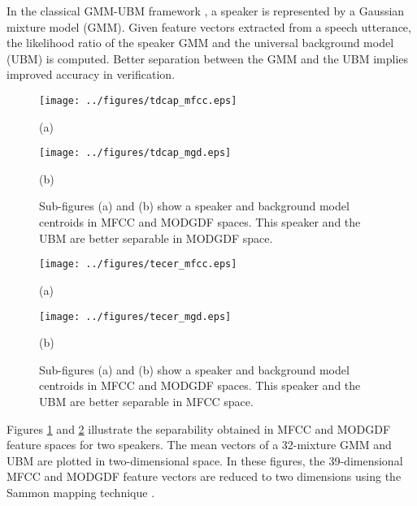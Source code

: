 \documentclass[preprint,12pt,5p]{elsarticle}
\begin{document}
In the classical GMM-UBM framework \cite{reynoldsAdaptedGMM}, a speaker is
represented by a Gaussian mixture model (GMM). Given feature vectors extracted
from a speech utterance, the likelihood ratio of the speaker GMM and the
universal background model (UBM) is computed. Better separation between the GMM
and the UBM implies improved accuracy in verification.

\begin{figure}[h]
\centering 
\begin{minipage}[c]{0.5\textwidth}
\centering 
    \texttt{[image: ../figures/tdcap\_mfcc.eps]}
	\caption*{(a)}
\end{minipage}

\begin{minipage}[c]{0.5\textwidth}
\centering  
\vspace{3mm}
    \texttt{[image: ../figures/tdcap\_mgd.eps]}

	\caption*{(b)}
\end{minipage}
\caption{Sub-figures (a) and (b) show a speaker and background model
centroids in MFCC and MODGDF spaces. This speaker and the UBM are better
separable in MODGDF space.}
\label{fig:ubm_sep1}
\end{figure}

\begin{figure}[h]
\centering 
\begin{minipage}[c]{0.5\textwidth}
\centering 
    \texttt{[image: ../figures/tecer\_mfcc.eps]}
	\caption*{(a)}
\end{minipage}

\begin{minipage}[c]{0.5\textwidth}
\centering  
\vspace{3mm}
    \texttt{[image: ../figures/tecer\_mgd.eps]}
	\caption*{(b)}
\end{minipage}
\caption{Sub-figures (a) and (b) show a speaker and background model
centroids in MFCC and MODGDF spaces. This speaker and the UBM are better
separable in MFCC space.}
\label{fig:ubm_sep2}
\end{figure}

Figures \ref{fig:ubm_sep1} and \ref{fig:ubm_sep2} illustrate the
separability obtained in MFCC and MODGDF feature spaces for two 
speakers. The mean vectors of a 32-mixture GMM and UBM are plotted in
two-dimensional space. In these figures, the 39-dimensional MFCC and MODGDF
feature vectors are reduced to two dimensions using the Sammon mapping technique
\cite{sammon}. 
\end{document}
